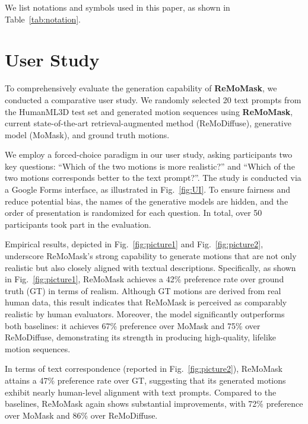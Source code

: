 \documentclass[10pt,journal,compsoc]{IEEEtran}
\begin{document}
We list notations and symbols used in this paper, as shown in Table~\ref{tab:notation}.



% 

\section{User Study}
\label{sec:userstudy}

To comprehensively evaluate the generation capability of \textbf{ReMoMask}, we conducted a comparative user study.  
We randomly selected 20 text prompts from the HumanML3D test set and generated motion sequences using \textbf{ReMoMask}, current state-of-the-art retrieval-augmented method (ReMoDiffuse), generative model (MoMask), and ground truth motions.  


We employ a forced-choice paradigm in our user study, asking participants two key questions: “Which of the two motions is more realistic?” and “Which of the two motions corresponds better to the text prompt?”. The study is conducted via a Google Forms interface, as illustrated in Fig.~\ref{fig:UI}. To ensure fairness and reduce potential bias, the names of the generative models are hidden, and the order of presentation is randomized for each question. In total, over 50 participants took part in the evaluation.

Empirical results, depicted in Fig.~\ref{fig:picture1} and Fig.~\ref{fig:picture2}, underscore ReMoMask’s strong capability to generate motions that are not only realistic but also closely aligned with textual descriptions. Specifically, as shown in Fig.~\ref{fig:picture1}, ReMoMask achieves a 42\% preference rate over ground truth (GT) in terms of realism. Although GT motions are derived from real human data, this result indicates that ReMoMask is perceived as comparably realistic by human evaluators. Moreover, the model significantly outperforms both baselines: it achieves 67\% preference over MoMask and 75\% over ReMoDiffuse, demonstrating its strength in producing high-quality, lifelike motion sequences.

In terms of text correspondence (reported in Fig.~\ref{fig:picture2}), ReMoMask attains a 47\% preference rate over GT, suggesting that its generated motions exhibit nearly human-level alignment with text prompts. Compared to the baselines, ReMoMask again shows substantial improvements, with 72\% preference over MoMask and 86\% over ReMoDiffuse.
\end{document}
